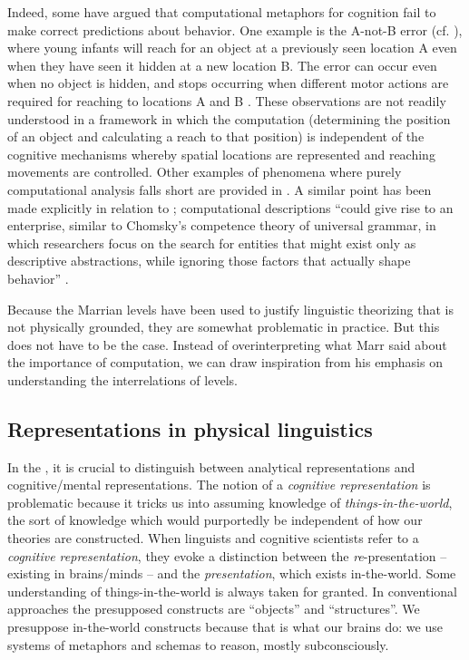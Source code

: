   Indeed, some have argued that computational metaphors for cognition fail to make correct predictions about behavior. One example is the A-not-B error (cf. \citealt{McClellandEtAl2010,SamuelsonEtAl2015}), where young infants will reach for an object at a previously seen location A even when they have seen it hidden at a new location B. The error can occur even when no object is hidden, and stops occurring when different motor actions are required for reaching to locations A and B \citep{SmithEtAl1999}. These observations are not readily understood in a framework in which the computation (determining the position of an object and calculating a reach to that position) is independent of the cognitive mechanisms whereby spatial locations are represented and reaching movements are controlled. Other examples of phenomena where purely computational analysis falls short are provided in \citet{SamuelsonEtAl2015}. A similar point has been made explicitly in relation to ; computational descriptions “could give rise to an enterprise, similar to Chomsky’s competence theory of universal grammar, in which researchers focus on the search for entities that might exist only as descriptive abstractions, while ignoring those factors that actually shape behavior” \citep{McClellandEtAl2010}.

  Because the Marrian levels have been used to justify linguistic theorizing that is not physically grounded, they are somewhat problematic in practice. But this does not have to be the case. Instead of overinterpreting what Marr said about the importance of computation, we can draw inspiration from his emphasis on understanding the interrelations of levels. 

\subsection{Representations in physical linguistics}

In the , it is crucial to distinguish between analytical representations and cognitive/mental representations. The notion of a \textit{cognitive representation} is problematic because it tricks us into assuming knowledge of \textit{things-in-the-world}, the sort of knowledge which would purportedly be independent of how our theories are constructed. When linguists and cognitive scientists refer to a \textit{cognitive representation}, they evoke a distinction between the \textit{re}{}-presentation -- existing in brains/minds -- and the \textit{presentation}, which exists in-the-world. Some understanding of things-in-the-world is always taken for granted. In conventional approaches the presupposed constructs are “objects” and “structures”. We presuppose in-the-world constructs because that is what our brains do: we use systems of metaphors and schemas to reason, mostly subconsciously. 

